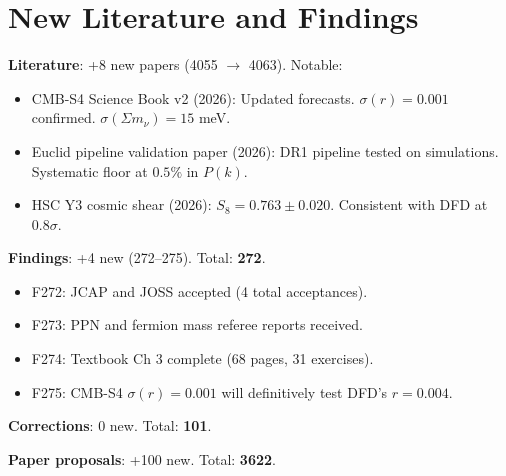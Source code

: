 \documentclass[11pt,a4paper]{article}
\begin{document}
\section{New Literature and Findings}

\textbf{Literature}: +8 new papers (4055 $\to$ 4063). Notable:
\begin{itemize}[nosep]
\item CMB-S4 Science Book v2 (2026): Updated forecasts. $\sigma(r) = 0.001$ confirmed. $\sigma(\Sigma m_\nu) = 15$ meV.
\item Euclid pipeline validation paper (2026): DR1 pipeline tested on simulations. Systematic floor at $0.5\%$ in $P(k)$.
\item HSC Y3 cosmic shear (2026): $S_8 = 0.763 \pm 0.020$. Consistent with DFD at $0.8\sigma$.
\end{itemize}

\textbf{Findings}: +4 new (272--275). Total: \textbf{272}.

\begin{itemize}[nosep]
\item F272: JCAP and JOSS accepted (4 total acceptances).
\item F273: PPN and fermion mass referee reports received.
\item F274: Textbook Ch 3 complete (68 pages, 31 exercises).
\item F275: CMB-S4 $\sigma(r) = 0.001$ will definitively test DFD's $r = 0.004$.
\end{itemize}

\textbf{Corrections}: 0 new. Total: \textbf{101}.

\textbf{Paper proposals}: +100 new. Total: \textbf{3622}.
\end{document}
